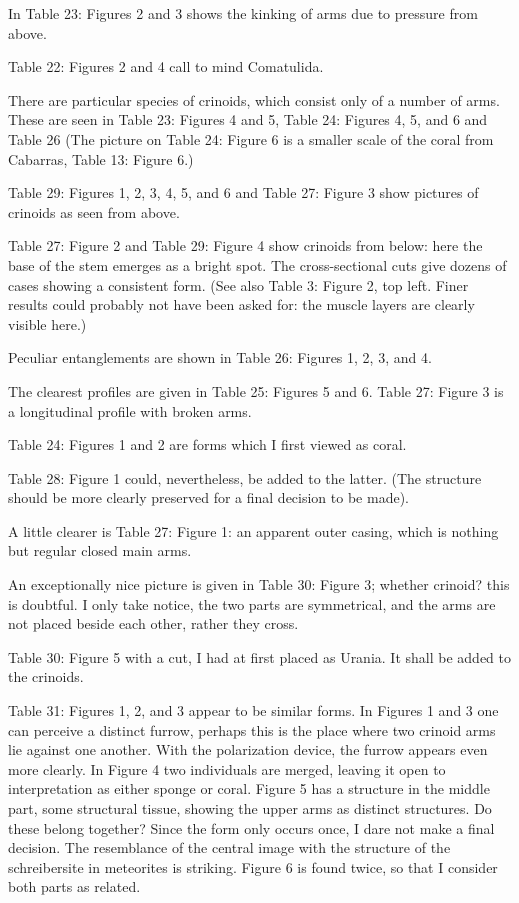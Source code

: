 \documentclass[a4paper, 11pt, oneside]{article}
\begin{document}
In Table 23: Figures 2 and 3 shows the kinking of arms due to pressure from above.

Table 22: Figures 2 and 4 call to mind Comatulida.

There are particular species of crinoids, which consist only of a number of arms. These are seen in Table 23: Figures 4 and 5, Table 24: Figures 4, 5, and 6 and Table 26 (The picture on Table 24: Figure 6 is a smaller scale of the coral from Cabarras, Table 13: Figure 6.)

Table 29: Figures 1, 2, 3, 4, 5, and 6 and Table 27: Figure 3 show pictures of crinoids as seen from above.

Table 27: Figure 2 and Table 29: Figure 4 show crinoids from below: here the base of the stem emerges as a bright spot. The cross-sectional cuts give dozens of cases showing a consistent form. (See also Table 3: Figure 2, top left. Finer results could probably not have been asked for: the muscle layers are clearly visible here.)

Peculiar entanglements are shown in Table 26: Figures 1, 2, 3, and 4.

The clearest profiles are given in Table 25: Figures 5 and 6. Table 27: Figure 3 is a longitudinal profile with broken arms.

Table 24: Figures 1 and 2 are forms which I first viewed as coral.

Table 28: Figure 1 could, nevertheless, be added to the latter. (The structure should be more clearly preserved for a final decision to be made).

A little clearer is Table 27: Figure 1: an apparent outer casing, which is nothing but regular closed main arms.

An exceptionally nice picture is given in Table 30: Figure 3; whether crinoid? this is doubtful. I only take notice, the two parts are symmetrical, and the arms are not placed beside each other, rather they cross.

Table 30: Figure 5 with a cut, I had at first placed as Urania. It shall be added to the crinoids.

Table 31: Figures 1, 2, and 3 appear to be similar forms. In Figures 1 and 3 one can perceive a distinct furrow, perhaps this is the place where two crinoid arms lie against one another. With the polarization device, the furrow appears even more clearly. In Figure 4 two individuals are merged, leaving it open to interpretation as either sponge or coral. Figure 5 has a structure in the middle part, some structural tissue, showing the upper arms as distinct structures. Do these belong together? Since the form only occurs once, I dare not make a final decision. The resemblance of the central image with the structure of the schreibersite in meteorites is striking. Figure 6 is found twice, so that I consider both parts as related.
\end{document}

